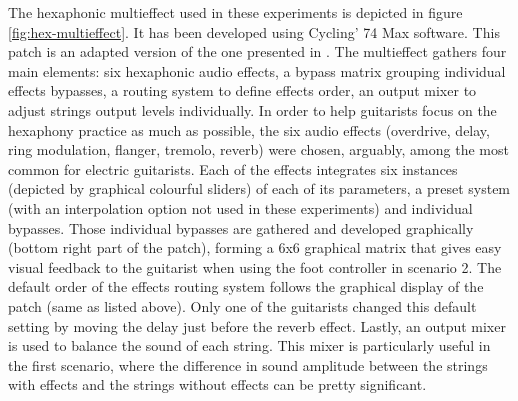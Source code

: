 \documentclass{article}
\begin{document}
The hexaphonic multieffect used in these experiments is depicted in figure \ref{fig:hex-multieffect}. It has been developed using Cycling' 74 Max software. This patch is an adapted version of the one presented in \cite{Reboursiere2020_Puzzle_eng}. The multieffect gathers four main elements: six hexaphonic audio effects, a bypass matrix grouping individual effects bypasses, a routing system to define effects order, an output mixer to adjust strings  output levels individually. 
In order to help guitarists focus on the hexaphony practice as much as possible, the six audio effects (overdrive, delay, ring modulation, flanger, tremolo, reverb) were chosen, arguably, among the most common for electric guitarists. Each of the effects integrates six instances (depicted by graphical colourful sliders) of each of its parameters, a preset system (with an interpolation option not used in these experiments) and individual bypasses. 
Those individual bypasses are gathered and developed graphically (bottom right part of the patch), forming a 6x6 graphical matrix that gives easy visual feedback to the guitarist when using the foot controller in scenario 2. 
The default order of the effects routing system follows the graphical display of the patch (same as listed above). Only one of the guitarists changed this default setting by moving the delay just before the reverb effect. 
Lastly, an output mixer is used to balance the sound of each string. This mixer is particularly useful in the first scenario, where the difference in sound amplitude between the strings with effects and the strings without effects can be pretty significant.
\end{document}
